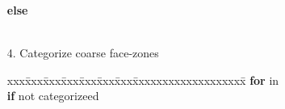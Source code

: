\documentclass[10pt]{article}
\begin{document}
\begin{itemize}
\begin{tabbing}
\>\>\>\>\> \textbf{else} \\
\>\>\>\>\>\>  \\
\end{tabbing}
\item[4.] Categorize coarse face-zones
\begin{tabbing}
xxx\=xxx\=xxx\=xxx\=xxx\=xxx\=xxx\=xxxxxxxxxxxxxxxxxxx\=\kill
\> \textbf{for}  in  \\
\>\> \textbf{if}  not categorizeed \\
\>\>\>        
\end{tabbing}
\end{itemize}

\end{document}
